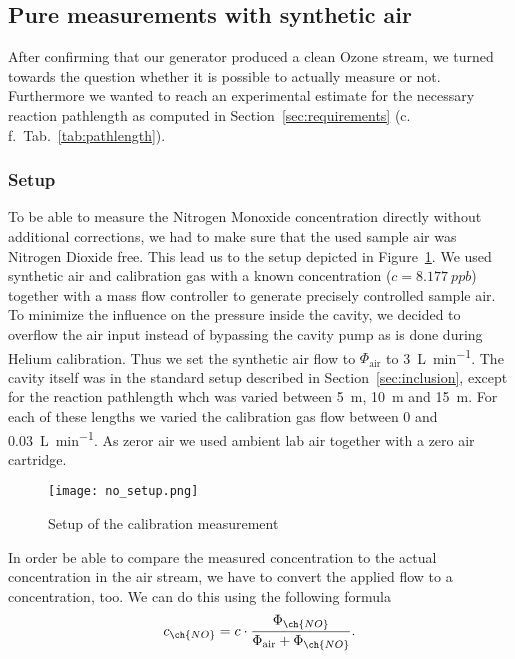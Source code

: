 \subsection{Pure  measurements with synthetic air}
\label{sec:no}

After confirming that our generator produced a clean Ozone stream, we
turned towards the question whether it is possible to actually measure
 or not. Furthermore we wanted to reach an experimental
estimate for the necessary reaction pathlength as computed in
Section~\ref{sec:requirements} (c.\,f.\
Tab.~\ref{tab:pathlength}). 

\subsubsection{Setup}
\label{sec:no-setup}

To be able to measure the Nitrogen
Monoxide concentration directly without additional corrections, we had
to make sure that the used sample air was Nitrogen Dioxide free. This
lead us to the setup depicted in Figure~\ref{fig:no-setup}. We used
synthetic air and  calibration gas with a known \ch{NO} concentration ($c
= \SI{8.177}{ppb}$) together with a mass flow controller to generate
precisely controlled sample air. To minimize the influence on the
pressure inside the cavity, we decided to overflow the air input
instead of bypassing the cavity pump as is done during Helium
calibration. Thus we set the synthetic air flow to $\Phi_{\text{air}}$
to \SI{3}{\liter\per\minute}. The cavity itself was in the standard
setup described in Section~\ref{sec:inclusion}, except for the
reaction pathlength whch was varied between \SI{5}{\meter},
\SI{10}{\meter} and \SI{15}{\meter}. For each of these lengths we
varied the \ch{NO} calibration gas flow between \num{0} and
\SI{0.03}{\liter\per\minute}. As zeror air we used ambient lab air
together with a zero air cartridge.

\begin{figure}[htbp]
  \centering
  \texttt{[image: no\_setup.png]}
  \caption{Setup of the calibration measurement}
  \label{fig:no-setup}
\end{figure}

In order be able to compare the measured  concentration to the
actual concentration in the air stream, we have to convert the applied
\ch{NO} flow to a concentration, too. We can do this using the
following formula
\begin{align}
  c_{\ch{NO}} = c \cdot \frac{\Phi_{\ch{NO}}}{\Phi_{\text{air}} +
  \Phi_{\ch{NO}}}. \label{eq:c-flow}
\end{align}

